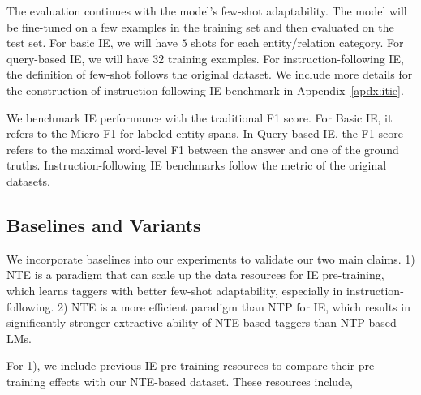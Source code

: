 The evaluation continues with the model's few-shot adaptability. The model will be fine-tuned on a few examples in the training set and then evaluated on the test set. For basic IE, we will have $5$ shots for each entity/relation category. For query-based IE, we will have $32$ training examples. For instruction-following IE, the definition of few-shot follows the original dataset. We include more details for the construction of instruction-following IE benchmark in Appendix~\ref{apdx:itie}.

We benchmark IE performance with the traditional F1 score. For Basic IE, it refers to the Micro F1 for labeled entity spans. In Query-based IE, the F1 score refers to the maximal word-level F1 between the answer and one of the ground truths. Instruction-following IE benchmarks follow the metric of the original datasets.


\subsection{Baselines and Variants}



We incorporate baselines into our experiments to validate our two main claims. 1) NTE is a paradigm that can scale up the data resources for IE pre-training, which learns taggers with better few-shot adaptability, especially in instruction-following. 2) NTE is a more efficient paradigm than NTP for IE, which results in significantly stronger extractive ability of NTE-based taggers than NTP-based LMs.

For 1), we include previous IE pre-training resources to compare their pre-training effects with our NTE-based dataset. These resources include,

